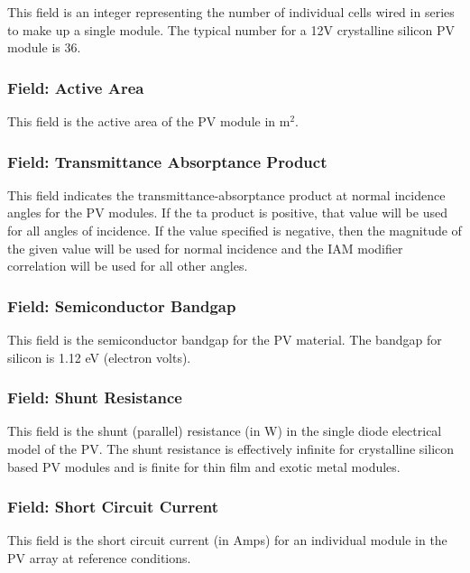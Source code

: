 This field is an integer representing the number of individual cells wired in series to make up a single module. The typical number for a 12V crystalline silicon PV module is 36.

\subsubsection{Field: Active Area}\label{field-active-area}

This field is the active area of the PV module in m\(^{2}\).

\subsubsection{Field: Transmittance Absorptance Product}\label{field-transmittance-absorptance-product}

This field indicates the transmittance-absorptance product at normal incidence angles for the PV modules. If the ta product is positive, that value will be used for all angles of incidence. If the value specified is negative, then the magnitude of the given value will be used for normal incidence and the IAM modifier correlation will be used for all other angles.

\subsubsection{Field: Semiconductor Bandgap}\label{field-semiconductor-bandgap}

This field is the semiconductor bandgap for the PV material. The bandgap for silicon is 1.12 eV (electron volts).

\subsubsection{Field: Shunt Resistance}\label{field-shunt-resistance}

This field is the shunt (parallel) resistance (in W) in the single diode electrical model of the PV. The shunt resistance is effectively infinite for crystalline silicon based PV modules and is finite for thin film and exotic metal modules.

\subsubsection{Field: Short Circuit Current}\label{field-short-circuit-current}

This field is the short circuit current (in Amps) for an individual module in the PV array at reference conditions.

